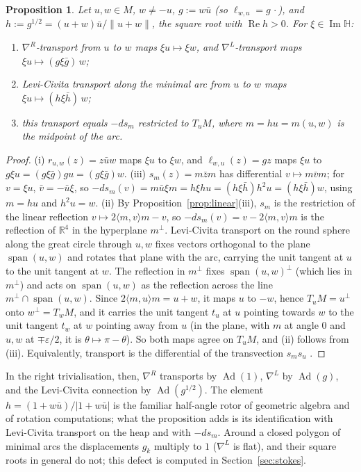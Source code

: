 \documentclass[11pt,reqno]{amsart}
\newtheorem{proposition}[theorem]{Proposition}
\theoremstyle{definition}
\theoremstyle{remark}
\numberwithin{equation}{section}
\newcommand{\R}{\mathbb{R}}
\newcommand{\HH}{\mathbb{H}}
\newcommand{\Ad}{\operatorname{Ad}}
\newcommand{\re}{\operatorname{Re}}
\newcommand{\im}{\operatorname{Im}}
\newcommand{\ip}[2]{\langle #1,#2\rangle}
\begin{document}
\begin{proposition}\label{prop:LCarc}
Let $u,w\in M$, $w\ne-u$, $g:=w\bar u$ (so $\ell_{w,u}=g\,\cdot$), and $h:=g^{1/2}=(u+w)\bar u/\lVert u+w\rVert$,
the square root with $\re h>0$.  For $\xi\in\im\HH$:
\begin{enumerate}[label=(\roman*)]
\item $\nabla^R$-transport from $u$ to $w$ maps $\xi u\mapsto\xi w$, and $\nabla^L$-transport maps
$\xi u\mapsto(g\xi\bar g)\,w$;
\item Levi-Civita transport along the minimal arc from $u$ to $w$ maps $\xi u\mapsto(h\xi\bar h)\,w$;
\item this transport equals $-ds_m$ restricted to $T_uM$, where $m=hu=m(u,w)$ is the midpoint of the arc.
\end{enumerate}
\end{proposition}
\begin{proof}
(i) $r_{u,w}(z)=z\bar uw$ maps $\xi u$ to $\xi w$, and $\ell_{w,u}(z)=gz$ maps $\xi u$ to
$g\xi u=(g\xi\bar g)gu=(g\xi\bar g)w$.  (iii) $s_m(z)=m\bar zm$ has differential $v\mapsto m\bar vm$; for
$v=\xi u$, $\bar v=-\bar u\xi$, so $-ds_m(v)=m\bar u\xi m=h\xi hu=(h\xi\bar h)h^2u=(h\xi\bar h)w$, using $m=hu$
and $h^2u=w$.  (ii) By Proposition~\ref{prop:linear}(iii), $s_m$ is the restriction of the linear reflection
$v\mapsto2\ip mvm-v$, so $-ds_m(v)=v-2\ip mvm$ is the reflection of $\R^4$ in the hyperplane $m^\perp$.  Levi-Civita
transport on the round sphere along the great circle through $u,w$ fixes vectors orthogonal to the plane
$\operatorname{span}(u,w)$ and rotates that plane with the arc, carrying the unit tangent at $u$ to the unit tangent at
$w$.  The reflection in $m^\perp$ fixes $\operatorname{span}(u,w)^\perp$ (which lies in $m^\perp$) and acts on
$\operatorname{span}(u,w)$ as the reflection across the line $m^\perp\cap\operatorname{span}(u,w)$.  Since $2\ip mum=u+w$, it maps
$u$ to $-w$, hence $T_uM=u^\perp$ onto $w^\perp=T_wM$, and it carries the unit tangent $t_u$ at $u$ pointing towards $w$ to the
unit tangent $t_w$ at $w$ pointing away from $u$ (in the plane, with $m$ at angle $0$ and $u,w$ at $\mp\varepsilon/2$, it is
$\theta\mapsto\pi-\theta$).  So both maps agree on $T_uM$, and (ii) follows from (iii).  Equivalently, transport is the
differential of the transvection $s_ms_u$ \cite[Ch.~IV, \S3]{Helgason}.
\end{proof}

In the right trivialisation, then, $\nabla^R$ transports by $\Ad(1)$, $\nabla^L$ by $\Ad(g)$, and the
Levi-Civita connection by $\Ad(g^{1/2})$.  The element $h=(1+w\bar u)/\lvert1+w\bar u\rvert$ is the familiar half-angle rotor of
geometric algebra and of rotation computations; what the proposition adds is its identification with Levi-Civita transport
on the heap and with $-ds_m$.  Around a closed polygon of minimal arcs the displacements $g_k$
multiply to $1$ ($\nabla^L$ is flat), and their square roots in general do not; this defect is computed in
Section~\ref{sec:stokes}.
\end{document}
